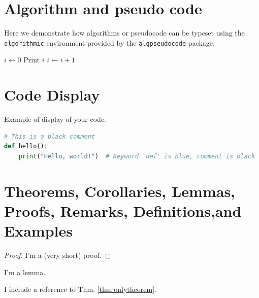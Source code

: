 \section{Algorithm and pseudo code}

Here we demonstrate how algorithms or pseudocode can be typeset using the \verb|algorithmic| environment provided by the \verb|algpseudocode| package.



\begin{algorithm}
\caption{Example While Loop}
\begin{algorithmic}[1]
\State $i \gets 0$
    \State Print $i$
    \State $i \gets i + 1$ 
\EndWhile
\end{algorithmic}
\end{algorithm}


\section{Code Display}

Example of display of your code. 

\begin{lstlisting}[language=Python]
# This is a black comment
def hello():
    print("Hello, world!")  # Keyword 'def' is blue, comment is black
\end{lstlisting}





\section[Theorems, Corollaries, Lemmas, Proofs, Remarks, Definitions and Examples]{Theorems, Corollaries, Lemmas, Proofs, Remarks, Definitions,and Examples}

\begin{theorem}
\label{thm:onlytheorem}
\blindtext
\end{theorem}

\begin{proof}
I'm a (very short) proof.
\end{proof}

\begin{lemma}
I'm a lemma.
\end{lemma}

\begin{corollary}
I include a reference to Thm. \ref{thm:onlytheorem}.
\end{corollary}

